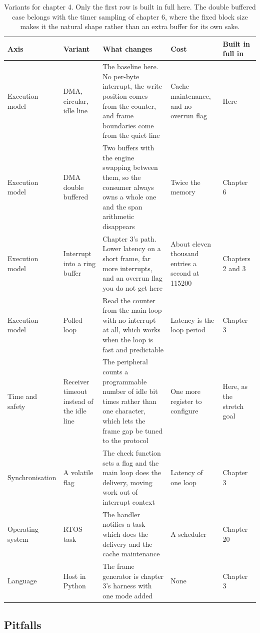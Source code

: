 \begin{table}[H]\centering\small
\begin{tabular}{p{24mm}p{26mm}p{44mm}p{22mm}p{20mm}}
\toprule
Axis & Variant & What changes & Cost & Built in full in \\
\midrule
Execution model & DMA, circular, idle line & The baseline here. No per-byte interrupt, the write position comes from the counter, and frame boundaries come from the quiet line & Cache maintenance, and no overrun flag & Here \\
Execution model & DMA double buffered & Two buffers with the engine swapping between them, so the consumer always owns a whole one and the span arithmetic disappears & Twice the memory & Chapter 6 \\
Execution model & Interrupt into a ring buffer & Chapter 3's path. Lower latency on a short frame, far more interrupts, and an overrun flag you do not get here & About eleven thousand entries a second at 115200 & Chapters 2 and 3 \\
Execution model & Polled loop & Read the counter from the main loop with no interrupt at all, which works when the loop is fast and predictable & Latency is the loop period & Chapter 3 \\
Time and safety & Receiver timeout instead of the idle line & The peripheral counts a programmable number of idle bit times rather than one character, which lets the frame gap be tuned to the protocol & One more register to configure & Here, as the stretch goal \\
Synchronisation & A volatile flag & The check function sets a flag and the main loop does the delivery, moving work out of interrupt context & Latency of one loop & Chapter 3 \\
Operating system & RTOS task & The handler notifies a task which does the delivery and the cache maintenance & A scheduler & Chapter 20 \\
Language & Host in Python & The frame generator is chapter 3's harness with one mode added & None & Chapter 3 \\
\bottomrule
\end{tabular}
\caption{Variants for chapter 4. Only the first row is built in full here. The double buffered case belongs with the timer sampling of chapter 6, where the fixed block size makes it the natural shape rather than an extra buffer for its own sake.}
\end{table}

\subsection*{Pitfalls}

